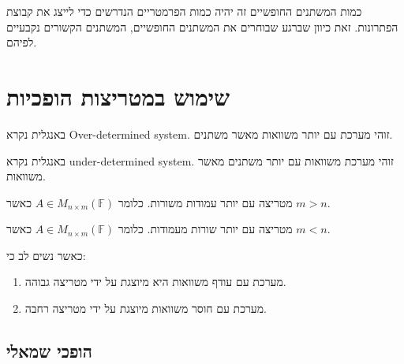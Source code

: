\documentclass{tstextbook}
\begin{document}
\begin{proposition}
כמות המשתנים החופשיים זה יהיה כמות הפרמטריים הנדרשים כדי לייצג את קבוצת הפתרונות. זאת כיוון שברגע שבוחרים את המשתנים החופשיים, המשתנים הקשורים נקבעיים לפיהם.

\end{proposition}
\section{שימוש במטריצות הופכיות}

\begin{definition}
באנגלית נקרא Over-determined system. זוהי מערכת עם יותר משוואות מאשר משתנים.

\end{definition}
\begin{definition}
באנגלית נקרא under-determined system. זוהי מערכת משוואות עם יותר משתנים מאשר משוואות.

\end{definition}
\begin{definition}
מטריצה עם יותר עמודות משורות. כלומר \(A \in M_{n \times m}\left( \mathbb{F}  \right)\) כאשר \(m>n\).

\end{definition}
\begin{definition}
מטריצה עם יותר שורות מעמודות. כלומר \(A \in M_{n \times m}\left( \mathbb{F}  \right)\) כאשר \(m<n\).

\end{definition}
כאשר נשים לב כי:

\begin{enumerate}
  \item מערכת עם עודף משוואות היא מיוצגת על ידי מטריצה גבוהה. 


  \item מערכת עם חוסר משוואות מיוצגת על ידי מטריצה רחבה. 


\end{enumerate}
\subsection{הופכי שמאלי}
\end{document}
